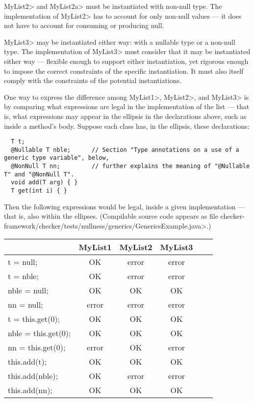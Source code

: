 \<MyList2> and \<MyList2a> must be instantiated with non-null type.
The implementation of \<MyList2> has to account for only non-null values --- it
does not have to account for consuming or producing null.

\<MyList3> may be instantiated either way:
with a nullable type or a non-null type.  The implementation of \<MyList3> must consider
that it may be instantiated either way --- flexible enough to support either
instantiation, yet rigorous enough to impose the correct constraints of the
specific instantiation.  It must also itself comply with the constraints of
the potential instantiations.

One way to express the difference among \<MyList1>, \<MyList2>, and
\<MyList3> is by comparing what expressions are legal in the implementation
of the list --- that is, what expressions may appear in the ellipsis in the
declarations above, such as inside a method's body.  Suppose each class
has, in the ellipsis, these declarations:

\begin{Verbatim}
  T t;
  @Nullable T nble;      // Section "Type annotations on a use of a generic type variable", below,
  @NonNull T nn;         // further explains the meaning of "@Nullable T" and "@NonNull T".
  void add(T arg) { }
  T get(int i) { }
\end{Verbatim}

\noindent
Then the following expressions would be legal, inside a given
implementation --- that is, also within the ellipses.
(Compilable source code appears as file
\<checker-framework/checker/tests/nullness/generics/GenericsExample.java>.)

\begin{tabular}{|l|c|c|c|c|c|} \hline
                        & MyList1 & MyList2 & MyList3 \\ \hline
  t = null;             & OK      & error   & error   \\ \hline
  t = nble;             & OK      & error   & error   \\ \hline
  nble = null;          & OK      & OK      & OK      \\ \hline
  nn = null;            & error   & error   & error   \\ \hline
  t = this.get(0);      & OK      & OK      & OK      \\ \hline
  nble = this.get(0);   & OK      & OK      & OK      \\ \hline
  nn = this.get(0);     & error   & OK      & error   \\ \hline
  this.add(t);          & OK      & OK      & OK      \\ \hline
  this.add(nble);       & OK      & error   & error   \\ \hline
  this.add(nn);         & OK      & OK      & OK      \\ \hline
\end{tabular}


